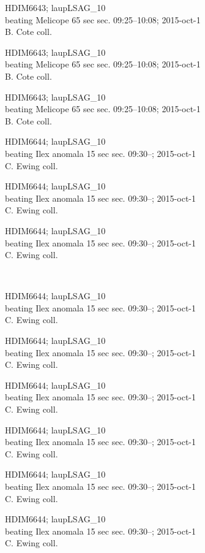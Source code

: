 \documentclass[2pt]{extarticle}
\begin{document}
\noindent
\parbox{0.16\textwidth}{\tiny \raggedright \rule[-0.3\baselineskip]{0pt}{10pt}HDIM6643; laupLSAG\_10\\ beating Melicope 65 sec sec. 09:25--10:08; 2015-oct-1\\ B. Cote coll.}
\parbox{0.16\textwidth}{\tiny \raggedright \rule[-0.3\baselineskip]{0pt}{10pt}HDIM6643; laupLSAG\_10\\ beating Melicope 65 sec sec. 09:25--10:08; 2015-oct-1\\ B. Cote coll.}
\parbox{0.16\textwidth}{\tiny \raggedright \rule[-0.3\baselineskip]{0pt}{10pt}HDIM6643; laupLSAG\_10\\ beating Melicope 65 sec sec. 09:25--10:08; 2015-oct-1\\ B. Cote coll.}
\parbox{0.16\textwidth}{\tiny \raggedright \rule[-0.3\baselineskip]{0pt}{10pt}HDIM6644; laupLSAG\_10\\ beating Ilex anomala 15 sec sec. 09:30--; 2015-oct-1\\ C. Ewing coll.}
\parbox{0.16\textwidth}{\tiny \raggedright \rule[-0.3\baselineskip]{0pt}{10pt}HDIM6644; laupLSAG\_10\\ beating Ilex anomala 15 sec sec. 09:30--; 2015-oct-1\\ C. Ewing coll.}
\parbox{0.16\textwidth}{\tiny \raggedright \rule[-0.3\baselineskip]{0pt}{10pt}HDIM6644; laupLSAG\_10\\ beating Ilex anomala 15 sec sec. 09:30--; 2015-oct-1\\ C. Ewing coll.} \\ 
\vspace{0.001in} 

\noindent
\parbox{0.16\textwidth}{\tiny \raggedright \rule[-0.3\baselineskip]{0pt}{10pt}HDIM6644; laupLSAG\_10\\ beating Ilex anomala 15 sec sec. 09:30--; 2015-oct-1\\ C. Ewing coll.}
\parbox{0.16\textwidth}{\tiny \raggedright \rule[-0.3\baselineskip]{0pt}{10pt}HDIM6644; laupLSAG\_10\\ beating Ilex anomala 15 sec sec. 09:30--; 2015-oct-1\\ C. Ewing coll.}
\parbox{0.16\textwidth}{\tiny \raggedright \rule[-0.3\baselineskip]{0pt}{10pt}HDIM6644; laupLSAG\_10\\ beating Ilex anomala 15 sec sec. 09:30--; 2015-oct-1\\ C. Ewing coll.}
\parbox{0.16\textwidth}{\tiny \raggedright \rule[-0.3\baselineskip]{0pt}{10pt}HDIM6644; laupLSAG\_10\\ beating Ilex anomala 15 sec sec. 09:30--; 2015-oct-1\\ C. Ewing coll.}
\parbox{0.16\textwidth}{\tiny \raggedright \rule[-0.3\baselineskip]{0pt}{10pt}HDIM6644; laupLSAG\_10\\ beating Ilex anomala 15 sec sec. 09:30--; 2015-oct-1\\ C. Ewing coll.}
\parbox{0.16\textwidth}{\tiny \raggedright \rule[-0.3\baselineskip]{0pt}{10pt}HDIM6644; laupLSAG\_10\\ beating Ilex anomala 15 sec sec. 09:30--; 2015-oct-1\\ C. Ewing coll.} \\ 
\vspace{0.001in} 
\end{document}
